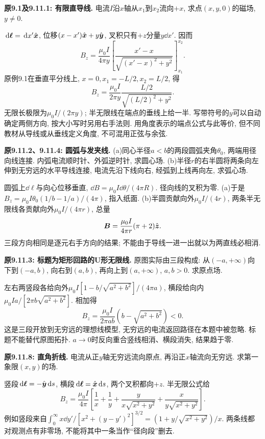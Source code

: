 \label{tb:finite-b}
\begin{example}
\textbf{原9.1及9.11.1: 有限直导线.} 
电流$I$沿$x$轴从$x_1$到$x_2$流向$+x$, 求点$(x,y,0)$的磁场, $y\ne0$.
\end{example}
\begin{solution}
$\,\mathrm d\boldsymbol{\ell}=\,\mathrm d x'\hat{\boldsymbol{x}}$, 位移$(x-x')\hat{\boldsymbol{x}}+y\hat{\boldsymbol{y}}$, 叉积只有$+z$分量$y\dd x'$. 因而
\[B_z=\frac{\mu_0I}{4\pi y}\left[\frac{x'-x}{\sqrt{(x'-x)^2+y^2}}\right]_{x_1}^{x_2}.\]
原例9.1在垂直平分线上, $x=0,x_1=-L/2,x_2=L/2$, 得
\[B_z=\frac{\mu_0I}{2\pi y}\frac{L/2}{\sqrt{(L/2)^2+y^2}}.\]
无限长极限为$\mu_0I/(2\pi y)$; 半无限线在端点的垂线上给一半. 写带符号的$y$可以自动确定两侧方向, 按大小写时另用右手法则. 用角度表示的端点公式与此等价, 但不同教材从导线或从垂线定义角度, 不可混用正弦与余弦.
\end{solution}

\begin{example}
\textbf{原9.11.2、9.11.4: 圆弧与发夹线.} 
(a)同心半径$a<b$的两段圆弧夹角$\theta_0$, 两端用径向线连接. 内弧电流顺时针、外弧逆时针, 求圆心场. (b)半径$r$的右半圆将两条向左伸到无穷远的水平导线连接, 电流先沿下线向右, 经弧到上线再向左, 求弧心场.
\end{example}
\begin{solution}
圆弧上$\dd\ell$与向心位移垂直, $\dd B=\mu_0I\dd\theta/(4\pi R)$. 径向线的叉积为零. (a)于是$B_z=\mu_0I\theta_0(1/b-1/a)/(4\pi)$, 指入纸面. (b)半圆贡献向外$\mu_0I/(4r)$, 两条半无限线各贡献向外$\mu_0I/(4\pi r)$, 总量
\[\boldsymbol{B}=\frac{\mu_0I}{4\pi r}(\pi+2)\hat{\boldsymbol{z}}.\]
三段方向相同是逐元右手方向的结果; 不能由于导线一进一出就以为两直线必相消.
\end{solution}

\begin{example}
\textbf{原9.11.3: 标题为矩形回路的U形无限线.} 
原图实际由三段构成: 从$(-a,+\infty)$向下到$(-a,b)$, 向右到$(a,b)$, 再向上到$(a,+\infty)$, $a,b>0$. 求原点场.
\end{example}
\begin{solution}
左右两竖段各给向外$\mu_0I[1-b/\sqrt{a^2+b^2}]/(4\pi a)$, 横段给向内$\mu_0Ia/[2\pi b\sqrt{a^2+b^2}]$. 相加得
\[B_z=\frac{\mu_0I}{2\pi ab}\left(b-\sqrt{a^2+b^2}\right)<0.\]
这是三段开放到无穷远的理想线模型, 无穷远的电流返回路径在本题中被忽略. 标题不能替代原图拓扑. $a\to0$时反向重合竖线相消、横段消失, 结果趋于零.
\end{solution}

\begin{example}
\textbf{原9.11.8: 直角折线.} 
电流从正$y$轴无穷远流向原点, 再沿正$x$轴流向无穷远. 求第一象限$(x,y)$的场.
\end{example}
\begin{solution}
竖段$\,\mathrm d\boldsymbol{\ell}=-\hat{\boldsymbol{y}}\,\mathrm d s$, 横段$\,\mathrm d\boldsymbol{\ell}=\hat{\boldsymbol{x}}\,\mathrm d s$, 两个叉积都向$+z$. 半无限公式给
\[B_z=\frac{\mu_0I}{4\pi}\left[\frac1x+\frac1y+\frac{y}{x\sqrt{x^2+y^2}}+\frac{x}{y\sqrt{x^2+y^2}}\right].\]
例如竖段来自$\int_0^\infty x\dd y'/[x^2+(y-y')^2]^{3/2}=(1+y/\sqrt{x^2+y^2})/x$. 两条线都对观测点有非零场, 不能将其中一条当作“径向段”删去.
\end{solution}

